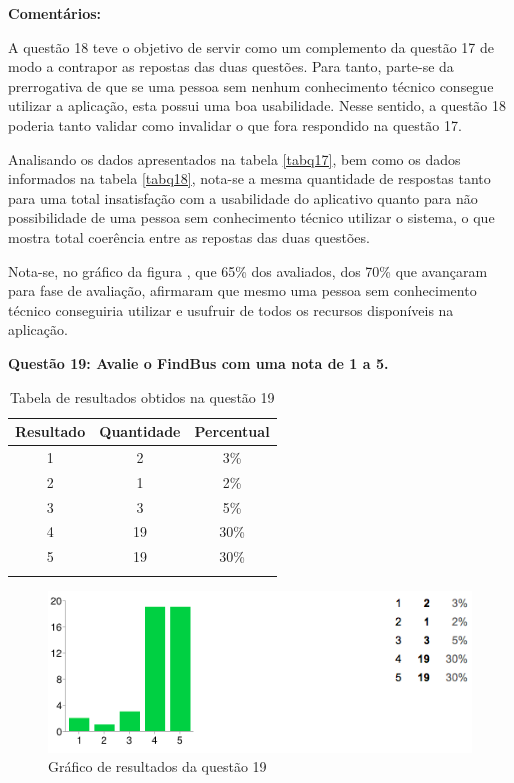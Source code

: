 \textbf{Comentários:}

A questão 18 teve o objetivo de servir como um complemento da questão 17 de modo a contrapor as repostas das duas questões. Para tanto, parte-se da prerrogativa de que se uma pessoa sem nenhum conhecimento técnico consegue utilizar a aplicação, esta possui uma boa usabilidade. Nesse sentido, a questão 18 poderia tanto validar como invalidar o que fora respondido na questão 17.
	
Analisando os dados apresentados na tabela \ref{tabq17}, bem como os dados informados na tabela \ref{tabq18}, nota-se a mesma quantidade de respostas tanto para uma total insatisfação com a usabilidade do aplicativo quanto para não possibilidade de uma pessoa sem conhecimento técnico utilizar o sistema, o que mostra total coerência entre as repostas das duas questões.
	
Nota-se, no gráfico da figura , que 65\% dos avaliados, dos 70\% que avançaram para fase de avaliação, afirmaram que mesmo uma pessoa sem conhecimento técnico conseguiria utilizar e usufruir de todos os recursos disponíveis na aplicação.\newline

\textbf{Questão 19: Avalie o FindBus com uma nota de 1 a 5.}


\begin{center}
\begin{longtable}{c|c|c}
\hline
    \multicolumn{1}{c}{\textbf{Resultado}} & \multicolumn{1}{c}{\textbf{Quantidade}} & \multicolumn{1}{c}{\textbf{Percentual}} \\
\hline
    1 & 2 &  3\%\\
    \hline
    2 & 1 & 2\%\\
    \hline
    3 & 3 &  5\%\\
    \hline
    4 & 19 & 30\%\\
    \hline
    5 & 19 & 30\%\\
    \hline
\caption{Tabela de resultados obtidos na questão 19}
\label{tabq19}
\end{longtable}
\end{center}

\begin{figure}[h]
\begin{center}
  \includegraphics[width=16cm]{images/graficos/questao19.png}
  \caption{Gráfico de resultados da questão 19}
  \label{fig:questao19}
\end{center}
\end{figure}

